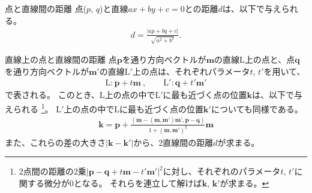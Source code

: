 \clearpage
\begin{Formula}{点と直線間の距離}
点($p$, $q$)と直線$ax+by+c=0$との距離$d$は、以下で与えられる。
\begin{align*}
  d = \frac{|ap+bq+c|}{\sqrt{a^2+b^2}}.
\end{align*}
\end{Formula}
\begin{Formula}{直線上の点と直線間の距離}
点$\boldsymbol p$を通り方向ベクトルが$\boldsymbol m$の直線L上の点と、点$\boldsymbol q$を通り方向ベクトルが$\boldsymbol m'$の直線$\mathrm L'$上の点は、それぞれパラメータ$t$, $t'$を用いて、
\begin{align*}
  \mathrm L: \boldsymbol p+t\boldsymbol m\ , \qquad
  \mathrm L': \boldsymbol q+t'\boldsymbol m'
\end{align*}
で表される。
このとき、L上の点の中で$\mathrm L'$に最も近づく点の位置$\boldsymbol k$は、以下で与えられる
\footnote{2点間の距離の2乗$|\boldsymbol p-\boldsymbol q+t\boldsymbol m-t'\boldsymbol m'|^2$に対し、それぞれのパラメータ$t$, $t'$に関する微分が0となる。
それらを連立して解けば$\boldsymbol k$, $\boldsymbol k'$が求まる。}。
$\mathrm L'$上の点の中でLに最も近づく点の位置$\boldsymbol k'$についても同様である。
\begin{align*}
  \boldsymbol k
  = \boldsymbol p
    +\frac{(\boldsymbol m-(\boldsymbol m, \boldsymbol m')\boldsymbol m', \boldsymbol p-\boldsymbol q)}
          {1+(\boldsymbol m, \boldsymbol m')^2}\boldsymbol m
\end{align*}
また、これらの差の大きさ$|\boldsymbol k-\boldsymbol k'|$から、2直線間の距離$d$が求まる。
\end{Formula}
